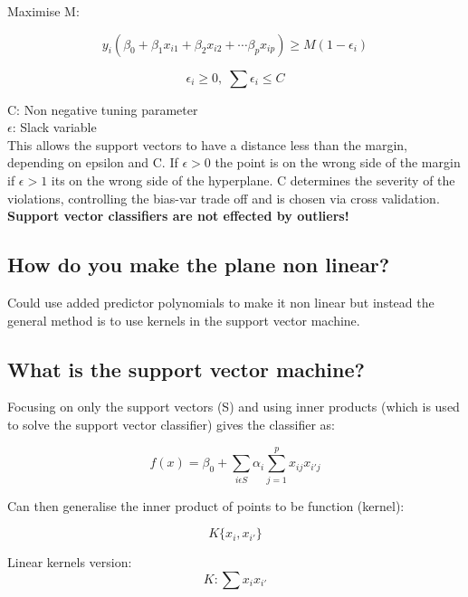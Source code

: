 \documentclass[11pt]{scrartcl} %
\begin{document}
Maximise M:

\begin{equation}
	y_i(\beta_0+\beta_1x_{i1}+\beta_2x_{i2}+\cdots \beta_px_{ip}) \geq M(1-\epsilon_i)
\end{equation}

\begin{equation}
	\epsilon_i \geq 0,\; \sum \epsilon_i \leq C
\end{equation}

C: Non negative tuning parameter\\
\(\epsilon\): Slack variable \\

This allows the support vectors to have a distance less than the margin, depending on epsilon and
C. If \(\epsilon>0\) the point is on the wrong side of the margin if \(\epsilon>1\) its on the wrong
side of the hyperplane. C determines the severity of the violations, controlling the bias-var
trade off and is chosen via cross validation.\\

\textbf{Support vector classifiers are not effected by outliers!}

\subsection{How do you make the plane non linear?}

Could use added predictor polynomials to make it non linear but instead the general method is to
use kernels in the support vector machine.

\subsection{What is the support vector machine?}

Focusing on only the support vectors (S) and using inner products (which is used to solve the
support vector classifier) gives the classifier as:

\begin{equation}
	f(x) = \beta_0 + \sum_{i\epsilon S}{\alpha_i\sum^p_{j=1}{x_{ij}x_{i'j}}}
\end{equation}

Can then generalise the inner product of points to be function (kernel):

\begin{equation}
	K\{x_i,x_{i'}\}
\end{equation}

Linear kernels version:
\begin{equation}
	K : \sum{x_ix_{i'}}
\end{equation}
\end{document}
